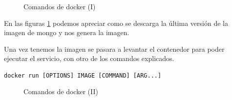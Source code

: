 \begin{figure}[htb]
\begin{center}
\caption{Comandos de docker (I)}
\label{Com1:ComandosDocker1}
\end{center}
\end{figure}

En las figuras \ref{Com1:ComandosDocker1} podemos apreciar como se descarga la última versión de la imagen de mongo y nos genera la imagen. 

Una vez tenemos la imagen se pasara a levantar el contenedor para poder ejecutar el servicio, con otro de los comandos explicados. 

\begin{center}
\texttt{docker run [OPTIONS] IMAGE [COMMAND] [ARG...]}
\end{center}
\pagebreak 

\begin{figure}[htb]
\begin{center}
\caption{Comandos de docker (II)}
\label{Com2:ComandosDocker2}
\end{center}
\end{figure}


